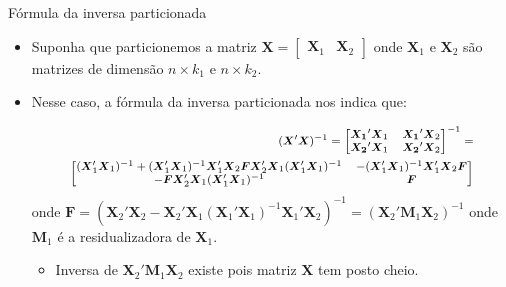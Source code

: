 \documentclass[11pt]{beamer}
\begin{document}
\begin{frame}{Fórmula da inversa particionada}
	\begin{itemize}
		\item 		Suponha que particionemos a matriz $\boldsymbol{X} = \begin{bmatrix}
			\boldsymbol{X}_1 & \boldsymbol{X}_2
		\end{bmatrix}$ onde $\boldsymbol{X}_1$ e $\boldsymbol{X}_2$ são matrizes de dimensão $n \times k_1$ e $n \times k_2$.
		\item Nesse caso, a fórmula da inversa particionada nos indica que:
		
	
	\begin{equation*}
			\footnotesize
		\begin{aligned}
			 (\boldsymbol{X}'\boldsymbol{X})^{-1} = \begin{bmatrix}
				\boldsymbol{X_1}'\boldsymbol{X}_1 & 	\boldsymbol{X_1}'\boldsymbol{X}_2 \\
				\boldsymbol{X_2}'\boldsymbol{X}_1 & 	\boldsymbol{X_2}'\boldsymbol{X}_2
			\end{bmatrix}^{-1} =\\  \begin{bmatrix}
				(\boldsymbol{X}_1'\boldsymbol{X}_1)^{-1}  + 	(\boldsymbol{X}_1'\boldsymbol{X}_1)^{-1} \boldsymbol{X}_1'\boldsymbol{X}_2\boldsymbol{F}\boldsymbol{X}_2'\boldsymbol{X}_1 (\boldsymbol{X}_1'\boldsymbol{X}_1)^{-1} & -  (\boldsymbol{X}_1'\boldsymbol{X}_1)^{-1} \boldsymbol{X}_1'\boldsymbol{X}_2\boldsymbol{F}\\
				- \boldsymbol{F}\boldsymbol{X}_2'\boldsymbol{X}_1(\boldsymbol{X}_1'\boldsymbol{X}_1)^{-1} & \boldsymbol{F}\end{bmatrix}
		\end{aligned}
	\end{equation*}
	onde $\boldsymbol{F}=(\boldsymbol{X}_2'\boldsymbol{X}_2 - \boldsymbol{X}_2'\boldsymbol{X}_1(\boldsymbol{X}_1'\boldsymbol{X}_1)^{-1} \boldsymbol{X}_1'\boldsymbol{X}_2 )^{-1} = (\boldsymbol{X}_2'\boldsymbol{M}_1 \boldsymbol{X}_2)^{-1}$ onde $\boldsymbol{M}_1$ é a residualizadora de $\boldsymbol{X}_1$.
\begin{itemize}
	\item Inversa de $\boldsymbol{X}_2'\boldsymbol{M}_1 \boldsymbol{X}_2$  existe pois matriz $\boldsymbol{X}$ tem posto cheio.
\end{itemize}
\end{itemize}

\end{frame}
\end{document}
